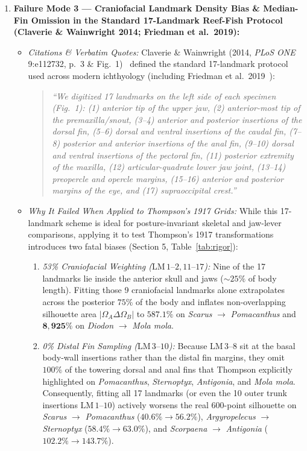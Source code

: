 \documentclass[11pt,a4paper]{article}
\theoremstyle{definition}
\theoremstyle{remark}
\begin{document}
\begin{enumerate}
  \item \textbf{Failure Mode 3 --- Craniofacial Landmark Density Bias \& Median-Fin Omission in the Standard 17-Landmark Reef-Fish Protocol (Claverie \& Wainwright 2014; Friedman et al.\ 2019):}
  \begin{itemize}
    \item \emph{Citations \& Verbatim Quotes:} Claverie \& Wainwright (2014, \emph{PLoS ONE} 9:e112732, p.\ 3 \& Fig.\ 1)~\cite{ClaverieWainwright2014} defined the standard 17-landmark protocol used across modern ichthyology (including Friedman et al.\ 2019~\cite{Friedman2019}):
    \begin{quote}
      \emph{``We digitized 17 landmarks on the left side of each specimen (Fig.\ 1): (1) anterior tip of the upper jaw, (2) anterior-most tip of the premaxilla/snout, (3--4) anterior and posterior insertions of the dorsal fin, (5--6) dorsal and ventral insertions of the caudal fin, (7--8) posterior and anterior insertions of the anal fin, (9--10) dorsal and ventral insertions of the pectoral fin, (11) posterior extremity of the maxilla, (12) articular-quadrate lower jaw joint, (13--14) preopercle and opercle margins, (15--16) anterior and posterior margins of the eye, and (17) supraoccipital crest.''}
    \end{quote}
    \item \emph{Why It Failed When Applied to Thompson's 1917 Grids:} While this 17-landmark scheme is ideal for posture-invariant skeletal and jaw-lever comparisons, applying it to test Thompson's 1917 transformations introduces two fatal biases (Section 5, Table~\ref{tab:rigor}):
    \begin{enumerate}
      \item \emph{53\% Craniofacial Weighting ($\mathrm{LM}\,1\text{--}2, 11\text{--}17$):} Nine of the 17 landmarks lie inside the anterior skull and jaws ($\sim 25\%$ of body length). Fitting those 9 craniofacial landmarks alone extrapolates across the posterior $75\%$ of the body and inflates non-overlapping silhouette area $|\Omega_A \Delta \Omega_B|$ to $\mathbf{587.1\%}$ on \emph{Scarus} $\to$ \emph{Pomacanthus} and $\mathbf{8{,}925\%}$ on \emph{Diodon} $\to$ \emph{Mola mola}.
      \item \emph{0\% Distal Fin Sampling ($\mathrm{LM}\,3\text{--}10$):} Because $\mathrm{LM}\,3\text{--}8$ sit at the basal body-wall insertions rather than the distal fin margins, they omit $100\%$ of the towering dorsal and anal fins that Thompson explicitly highlighted on \emph{Pomacanthus}, \emph{Sternoptyx}, \emph{Antigonia}, and \emph{Mola mola}. Consequently, fitting all 17 landmarks (or even the 10 outer trunk insertions $\mathrm{LM}\,1\text{--}10$) actively worsens the real 600-point silhouette on \emph{Scarus} $\to$ \emph{Pomacanthus} ($40.6\% \to 56.2\%$), \emph{Argyropelecus} $\to$ \emph{Sternoptyx} ($58.4\% \to 63.0\%$), and \emph{Scorpaena} $\to$ \emph{Antigonia} ($102.2\% \to 143.7\%$).
    \end{enumerate}
  \end{itemize}


\end{enumerate}
\end{document}
